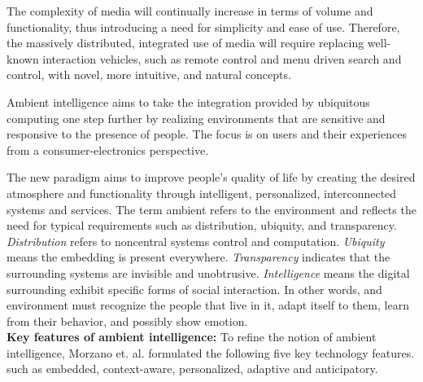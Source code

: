 \documentclass{sig-alternate}
\begin{document}
The complexity of media will continually increase in terms of volume and functionality, thus introducing a need for simplicity and ease of use. Therefore, the massively distributed, integrated use of media will require replacing well-known interaction vehicles, such as remote control and menu driven search and control, with novel, more intuitive, and natural concepts.

Ambient intelligence aims to take the integration provided by ubiquitous computing one step further by realizing environments that are sensitive and responsive to the presence of people. The focus is on users and their experiences from a consumer-electronics perspective.

The new paradigm aims to improve people's quality of life by creating the desired atmosphere and functionality through intelligent, personalized, interconnected systems and services. The term ambient refers to the environment and reflects the need for typical requirements such as distribution, ubiquity, and transparency. \textit{Distribution} refers to noncentral systems control and computation. \textit{Ubiquity} means the embedding is present everywhere. \textit{Transparency} indicates that the surrounding systems are invisible and unobtrusive. \textit{Intelligence} means the digital surrounding exhibit specific forms of social interaction. In other words, and environment must recognize the people that live in it, adapt itself to them, learn from their behavior, and possibly show emotion. \\

\noindent
\textbf{Key features of ambient intelligence: }
To refine the notion of ambient intelligence, Morzano et. al. formulated the following five key technology features.
such as embedded, context-aware, personalized, adaptive and  anticipatory.
\end{document}

